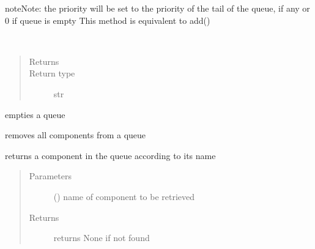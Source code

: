 \documentclass[letterpaper,10pt,english]{sphinxmanual}
\begin{document}
\begin{fulllineitems}
\begin{fulllineitems}
\begin{sphinxadmonition}{note}{Note:}
the priority will be set to
the priority of the tail of the queue, if any
or 0 if queue is empty 
This method is equivalent to add()
\end{sphinxadmonition}

\end{fulllineitems}


\begin{fulllineitems}
\label{\detokenize{Reference:salabim.Queue.base_name}}~\begin{quote}\begin{description}
\item[{Returns}] \leavevmode
{}

\item[{Return type}] \leavevmode
str

\end{description}\end{quote}

\end{fulllineitems}


\begin{fulllineitems}
\label{\detokenize{Reference:salabim.Queue.clear}}
empties a queue

removes all components from a queue

\end{fulllineitems}


\begin{fulllineitems}
\label{\detokenize{Reference:salabim.Queue.component_with_name}}
returns a component in the queue according to its name
\begin{quote}\begin{description}
\item[{Parameters}] \leavevmode
{} () \textendash{} name of component to be retrieved

\item[{Returns}] \leavevmode
{} \textendash{} returns None if not found


\end{description}
\end{quote}
\end{fulllineitems}
\end{fulllineitems}
\end{document}
